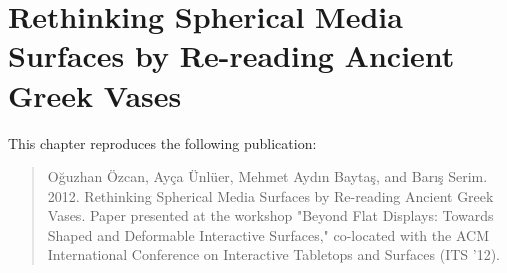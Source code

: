 \documentclass[11pt, twoside]{book}
\begin{document}
\chapter{Rethinking Spherical Media Surfaces by Re-reading Ancient Greek Vases}
\label{chp:app-paper-3}
This chapter reproduces the following publication:
\begin{quote}
Oğuzhan Özcan, Ayça Ünlüer, Mehmet Aydın Baytaş, and Barış Serim. 2012. Rethinking Spherical Media Surfaces by Re-reading Ancient Greek Vases. Paper presented at the workshop "Beyond Flat Displays: Towards Shaped and Deformable Interactive Surfaces," co-located with the ACM International Conference on Interactive Tabletops and Surfaces (ITS '12).
\end{quote}

\end{document}
